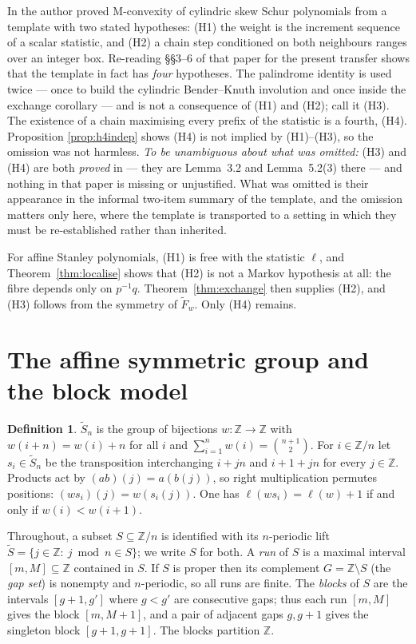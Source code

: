 \documentclass[11pt]{article}
\theoremstyle{definition}
\newtheorem{defn}[thm]{Definition}
\newcommand{\Z}{\mathbb{Z}}
\newcommand{\Saff}{\widetilde{S}_{n}}
\newcommand{\Fw}{\widetilde{F}_{w}}
\begin{document}
In \cite{Clio2026} the author proved M-convexity of cylindric skew Schur polynomials from a
template with two stated hypotheses: (H1) the weight is the increment sequence of a scalar
statistic, and (H2) a chain step conditioned on both neighbours ranges over an integer box.
Re-reading \S\S3--6 of that paper for the present transfer shows that the template in fact has
\emph{four} hypotheses. The palindrome identity \cite[Lem.~3.2]{Clio2026} is used twice --- once
to build the cylindric Bender--Knuth involution and once inside the exchange corollary --- and
is not a consequence of (H1) and (H2); call it (H3). The existence of a chain maximising every
prefix of the statistic \cite[Lem.~5.2(3)]{Clio2026} is a fourth, (H4). Proposition
\ref{prop:h4indep} shows (H4) is not implied by (H1)--(H3), so the omission was not harmless.
\emph{To be unambiguous about what was omitted:} (H3) and (H4) are both \emph{proved} in
\cite{Clio2026} --- they are Lemma~3.2 and Lemma~5.2(3) there --- and nothing in that paper is
missing or unjustified. What was omitted is their appearance in the informal two-item summary of
the template, and the omission matters only here, where the template is transported to a setting
in which they must be re-established rather than inherited.

For affine Stanley polynomials, (H1) is free with the statistic $\ell$, and
Theorem~\ref{thm:localise} shows that (H2) is not a Markov hypothesis at all: the fibre depends
only on $p^{-1}q$. Theorem~\ref{thm:exchange} then supplies (H2), and (H3) follows from the
symmetry of $\Fw$. Only (H4) remains.

\section{The affine symmetric group and the block model}\label{sec:blocks}

\begin{defn}
$\Saff$ is the group of bijections $w:\Z\to\Z$ with $w(i+n)=w(i)+n$ for all $i$ and
$\sum_{i=1}^{n}w(i)=\binom{n+1}{2}$. For $i\in\Z/n$ let $s_i\in\Saff$ be the transposition
interchanging $i+jn$ and $i+1+jn$ for every $j\in\Z$. Products act by
$(ab)(j)=a(b(j))$, so right multiplication permutes positions:
$(ws_i)(j)=w(s_i(j))$. One has $\ell(ws_i)=\ell(w)+1$ if and only if $w(i)<w(i+1)$.
\end{defn}

Throughout, a subset $S\subseteq\Z/n$ is identified with its $n$-periodic lift
$\widetilde S=\{j\in\Z:\ j\bmod n\in S\}$; we write $S$ for both. A \emph{run} of $S$ is a
maximal interval $[m,M]\subseteq\Z$ contained in $S$. If $S$ is proper then its complement
$G=\Z\setminus S$ (the \emph{gap set}) is nonempty and $n$-periodic, so all runs are finite. The
\emph{blocks} of $S$ are the intervals $[g+1,g']$ where $g<g'$ are consecutive gaps; thus each
run $[m,M]$ gives the block $[m,M+1]$, and a pair of adjacent gaps $g,g+1$ gives the singleton
block $[g+1,g+1]$. The blocks partition $\Z$.
\end{document}
